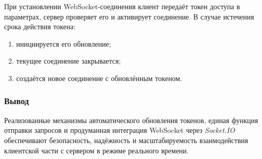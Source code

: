 При установлении WebSocket-соединения клиент передаёт токен доступа в параметрах, сервер проверяет его и активирует соединение. В случае истечения срока действия токена:
\begin{enumerate}
  \item инициируется его обновление;
  \item текущее соединение закрывается;
  \item создаётся новое соединение с обновлённым токеном.
\end{enumerate}

\subsubsection*{Вывод}

Реализованные механизмы автоматического обновления токенов, единая функция отправки запросов и продуманная интеграция WebSocket через \textit{Socket.IO} обеспечивают безопасность, надёжность и масштабируемость взаимодействия клиентской части с сервером в режиме реального времени.
